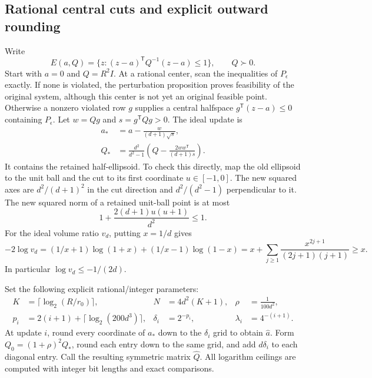 \subsection{Rational central cuts and explicit outward rounding}

Write
\[
 E(a,Q)=\{z:(z-a)^{\mathsf T}Q^{-1}(z-a)\le1\},
 \qquad Q\succ0.
\]
Start with $a=0$ and $Q=R^2I$.  At a rational center, scan the inequalities
of $P_\epsilon$ exactly.  If none is violated, the perturbation proposition
proves feasibility of the original system, although this center is not yet
an original feasible point.  Otherwise a nonzero violated row $g$ supplies
a central halfspace $g^{\mathsf T}(z-a)\le0$ containing $P_\epsilon$.
Let $w=Qg$ and $s=g^{\mathsf T}Qg>0$.  The ideal update is
\begin{align*}
 a_*&=a-\frac{w}{(d+1)\sqrt s},\\
 Q_*&=\frac{d^2}{d^2-1}
       \left(Q-\frac{2ww^{\mathsf T}}{(d+1)s}\right).
\end{align*}
It contains the retained half-ellipsoid.  To check this directly, map the
old ellipsoid to the unit ball and the cut to its first coordinate
$u\in[-1,0]$.  The new squared axes are $d^2/(d+1)^2$ in the cut direction
and $d^2/(d^2-1)$ perpendicular to it.  The new squared norm of a retained
unit-ball point is at most
\[
 1+\frac{2(d+1)u(u+1)}{d^2}\le1.
\]
For the ideal volume ratio $v_d$, putting $x=1/d$ gives
\[
 -2\log v_d
 =(1/x+1)\log(1+x)+(1/x-1)\log(1-x)
 =x+\sum_{j\ge1}\frac{x^{2j+1}}{(2j+1)(j+1)}\ge x.
\]
In particular $\log v_d\le-1/(2d)$.

Set the following explicit rational/integer parameters:
\begin{align*}
 K&=\lceil\log_2(R/r_0)\rceil,&
 N&=4d^2(K+1),& \rho&=\frac1{100d^2},\\
 p_i&=2(i+1)+\lceil\log_2(200d^3)\rceil,&
 \delta_i&=2^{-p_i},& \lambda_i&=4^{-(i+1)}.
\end{align*}
At update $i$, round every coordinate of $a_*$ down to the
$\delta_i$ grid to obtain $\widehat a$.  Form $Q_0=(1+\rho)^2Q_*$,
round each entry down to the same grid, and add $d\delta_i$ to each diagonal
entry.  Call the resulting symmetric matrix $\widehat Q$.  All logarithm
ceilings are computed with integer bit lengths and exact comparisons.

